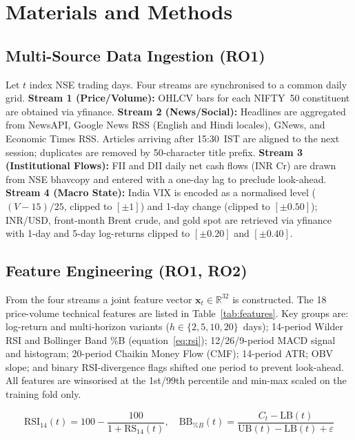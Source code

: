 \documentclass[12pt,a4paper]{article}
\begin{document}
\section{Materials and Methods}

\subsection{Multi-Source Data Ingestion (RO1)}

Let $t$ index NSE trading days. Four streams are synchronised to a common
daily grid. \textbf{Stream 1 (Price/Volume):} OHLCV bars for each NIFTY~50
constituent are obtained via yfinance. \textbf{Stream 2 (News/Social):} Headlines
are aggregated from NewsAPI, Google News RSS (English and Hindi locales), GNews,
and Economic Times RSS. Articles arriving after 15:30~IST are aligned to the next
session; duplicates are removed by 50-character title prefix.
\textbf{Stream 3 (Institutional Flows):} FII and DII daily net cash flows (INR Cr)
are drawn from NSE bhavcopy and entered with a one-day lag to preclude look-ahead.
\textbf{Stream 4 (Macro State):} India VIX is encoded as a normalised level
($(V\!-\!15)/25$, clipped to $[\pm1]$) and 1-day change (clipped to $[\pm0.50]$);
INR/USD, front-month Brent crude, and gold spot are retrieved via yfinance with
1-day and 5-day log-returns clipped to $[\pm0.20]$ and $[\pm0.40]$.

\subsection{Feature Engineering (RO1, RO2)}

From the four streams a joint feature vector $\mathbf{x}_{t}\!\in\!\mathbb{R}^{32}$
is constructed. The 18 price-volume technical features are listed in
Table~\ref{tab:features}. Key groups are: log-return and multi-horizon variants
($h\!\in\!\{2,5,10,20\}$~days); 14-period Wilder RSI and Bollinger Band \%B
(equation~\eqref{eq:rsi}); 12/26/9-period MACD signal and histogram;
20-period Chaikin Money Flow (CMF); 14-period ATR; OBV slope; and binary
RSI-divergence flags shifted one period to prevent look-ahead. All features are
winsorised at the 1st/99th percentile and min-max scaled on the training fold only.

\begin{equation}
\mathrm{RSI}_{14}(t)=100-\frac{100}{1+\mathrm{RS}_{14}(t)},\quad
\mathrm{BB}_{\%B}(t)=\frac{C_t-\mathrm{LB}(t)}{\mathrm{UB}(t)-\mathrm{LB}(t)+\varepsilon}
\label{eq:rsi}
\end{equation}
\end{document}
